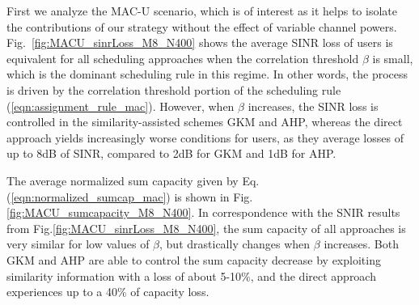 First we analyze the MAC-U scenario, which is of interest as it helps to isolate the contributions of our strategy without the effect of variable channel powers. 
Fig.~\ref{fig:MACU_sinrLoss_M8_N400} shows the average SINR loss of users is equivalent for all scheduling approaches when the correlation threshold $\beta$ is small, which is the dominant scheduling rule in this regime. In other words, the process is driven by the correlation threshold portion of the scheduling rule (\ref{eqn:assignment_rule_mac}). However, when $\beta$ increases, the SINR loss is controlled in the similarity-assisted schemes GKM and AHP, whereas the direct approach yields increasingly worse conditions for users, as they average losses of up to 8dB of SINR, compared to 2dB for GKM and 1dB for AHP. 


The average normalized sum capacity given by Eq.(\ref{eqn:normalized_sumcap_mac}) is shown in Fig.\ref{fig:MACU_sumcapacity_M8_N400}. In correspondence with the SNIR results from Fig.\ref{fig:MACU_sinrLoss_M8_N400}, the sum capacity of all approaches is very similar for low values of $\beta$, but drastically changes when $\beta$ increases. Both GKM and AHP are able to control the sum capacity decrease by exploiting similarity information with a loss of about 5-10\%, and the direct approach experiences up to a 40\% of capacity loss.


